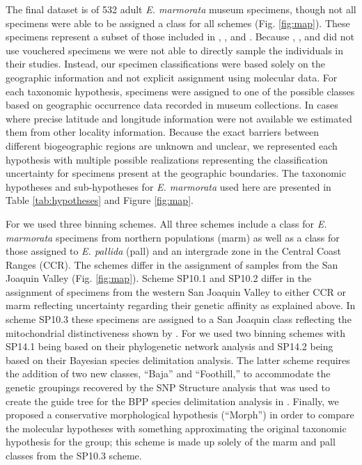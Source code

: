 \documentclass[fleqn,10pt,lineno]{wlpeerj} %
\begin{document}
The final dataset is of 532 adult \textit{E. marmorata} museum specimens, though not all specimens were able to be assigned a class for all schemes (Fig. \ref{fig:map}). These specimens represent a subset of those included in \citet{Angielczyk2007}, \citet{Angielczyk2011}, and \citet{Angielczyk2013a}. Because  \citet{Spinks2005}, \citet{Spinks2010}, and \citet{Spinks2014} did not use vouchered specimens we were not able to directly sample the individuals in their studies. Instead, our specimen classifications were based solely on the geographic information and not explicit assignment using molecular data. For each taxonomic hypothesis, specimens were assigned to one of the possible classes based on geographic occurrence data recorded in museum collections. In cases where precise latitude and longitude information were not available we estimated them from other locality information. Because the exact barriers between different biogeographic regions are unknown and unclear, we represented each hypothesis with multiple possible realizations representing the classification uncertainty for specimens present at the geographic boundaries. The taxonomic hypotheses and sub-hypotheses for \textit{E. marmorata} used here are presented in Table \ref{tab:hypotheses} and Figure \ref{fig:map}.

For \citet{Spinks2010} we used three binning schemes. All three schemes include a class for \textit{E. marmorata} specimens from northern populations (marm) as well as a class for those assigned to \textit{E. pallida} (pall) and an intergrade zone in the Central Coast Ranges (CCR). The schemes differ in the assignment of samples from the San Joaquin Valley (Fig. \ref{fig:map}). Scheme SP10.1 and SP10.2 differ in the assignment of specimens from the western San Joaquin Valley to either CCR or marm reflecting uncertainty regarding their genetic affinity as explained above. In scheme SP10.3 these specimens are assigned to a San Joaquin class reflecting the mitochondrial distinctiveness shown by \citet{Spinks2005}. For \citet{Spinks2014} we used two binning schemes with SP14.1 being based on their phylogenetic network analysis and SP14.2 being based on their Bayesian species delimitation analysis. The latter scheme requires the addition of two new classes, ``Baja'' and ``Foothill,'' to accommodate the genetic groupings recovered by the SNP Structure analysis that was used to create the guide tree for the BPP species delimitation analysis in \citet{Spinks2014}. Finally, we proposed a conservative morphological hypothesis (``Morph'') in order to compare the molecular hypotheses with something approximating the original taxonomic hypothesis for the group; this scheme is made up solely of the marm and pall classes from the SP10.3 scheme.
\end{document}
